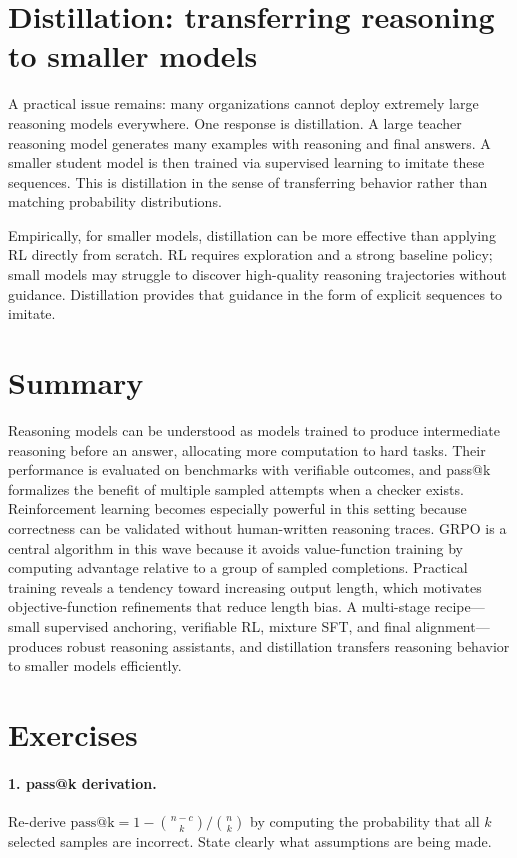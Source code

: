 \section{Distillation: transferring reasoning to smaller models}
A practical issue remains: many organizations cannot deploy extremely large reasoning models everywhere. One response is distillation. A large teacher reasoning model generates many examples with reasoning and final answers. A smaller student model is then trained via supervised learning to imitate these sequences. This is distillation in the sense of transferring behavior rather than matching probability distributions.

Empirically, for smaller models, distillation can be more effective than applying RL directly from scratch. RL requires exploration and a strong baseline policy; small models may struggle to discover high-quality reasoning trajectories without guidance. Distillation provides that guidance in the form of explicit sequences to imitate.

\section{Summary}
Reasoning models can be understood as models trained to produce intermediate reasoning before an answer, allocating more computation to hard tasks. Their performance is evaluated on benchmarks with verifiable outcomes, and pass@k formalizes the benefit of multiple sampled attempts when a checker exists. Reinforcement learning becomes especially powerful in this setting because correctness can be validated without human-written reasoning traces. GRPO is a central algorithm in this wave because it avoids value-function training by computing advantage relative to a group of sampled completions. Practical training reveals a tendency toward increasing output length, which motivates objective-function refinements that reduce length bias. A multi-stage recipe—small supervised anchoring, verifiable RL, mixture SFT, and final alignment—produces robust reasoning assistants, and distillation transfers reasoning behavior to smaller models efficiently.

\section{Exercises}
\paragraph{1. pass@k derivation.}
Re-derive \(\mathrm{pass@k} = 1 - \binom{n-c}{k}/\binom{n}{k}\) by computing the probability that all \(k\) selected samples are incorrect. State clearly what assumptions are being made.

